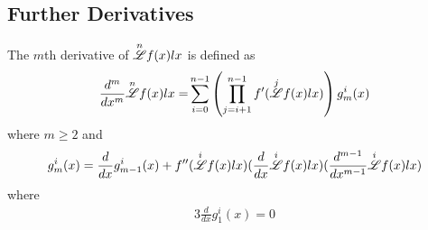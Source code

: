 \documentclass[12pt, letterpaper]{article}
\begin{document}
\subsection{Further Derivatives}

The $m$th derivative of $\overset{n}{\mathscr{L}}f(x)lx$ is defined as
\begin{alignat*}{3}
    \frac{d^m}{dx^m}\overset{n}{\mathscr{L}}f(x)lx = &\sum^{n-1}_{i=0}\left(\prod^{n-1}_{j=i+1}f'(\overset{j}{\mathscr{L}}f(x)lx)\right)g^i_m(x)\\
\end{alignat*}
where $m\ge2$ and
\begin{alignat*}{3}
    g^i_m(x)=\frac{d}{dx}g^i_{m-1}(x)+f''(\overset{i}{\mathscr{L}}f(x)lx)(\frac{d}{dx}\overset{i}{\mathscr{L}}f(x)lx)(\frac{d^{m-1}}{dx^{m-1}}\overset{i}{\mathscr{L}}f(x)lx)\\
\end{alignat*}
where
\begin{alignat*}{3}
    \frac{d}{dx}g^i_1(x)=0\\
\end{alignat*}
\end{document}
